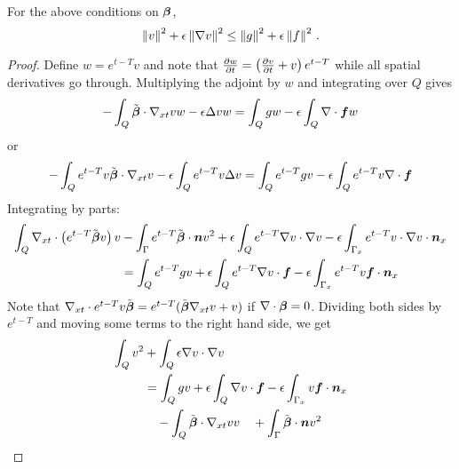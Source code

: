 \documentclass{article}
\begin{document}
\begin{lemma}
\label{lem:l2}
For the above conditions on $\boldsymbol\beta$,
\[
\left\| v \right\|^2+\epsilon\left\| \nabla v \right\|^2\leq\left\| g \right\|^2+\epsilon\left\| f \right\|^2\,.
\]
\end{lemma}
\begin{proof}
Define $w=e^{t-T}v$ and note that $\frac{\partial w}{\partial t}=\left( \frac{\partial v}{\partial t}+v \right)e^{t-T}$ while
all spatial derivatives go through.
Multiplying the adjoint by $w$ and integrating over $Q$ gives
\begin{align*}
-\int_Q\tilde{\boldsymbol\beta}\cdot\nabla_{xt} vw-\epsilon\Delta vw=\int_Qgw-\epsilon\int_Q\nabla\cdot\boldsymbol f w
\end{align*}
or
\begin{align*}
-\int_Qe^{t-T}v\tilde{\boldsymbol\beta}\cdot\nabla_{xt} v-\epsilon\int_Q e^{t-T}v\Delta v=\int_Qe^{t-T}gv-\epsilon\int_Qe^{t-T}v\nabla\cdot\boldsymbol f
\end{align*}
Integrating by parts:
\begin{align*}
\int_Q\nabla_{xt}\cdot\left( e^{t-T}\tilde{\boldsymbol\beta} v \right)v&
-\int_\Gamma e^{t-T}\tilde{\boldsymbol\beta}\cdot\boldsymbol n v^2
+\epsilon\int_Qe^{t-T}\nabla v\cdot\nabla v
-\epsilon\int_{\Gamma_x}e^{t-T}v\cdot\nabla v\cdot\boldsymbol n_x
\\
&=
\int_Qe^{t-T}gv
+\epsilon\int_Qe^{t-T}\nabla v\cdot\boldsymbol f
-\epsilon\int_{\Gamma_x}e^{t-T}v\boldsymbol f\cdot\boldsymbol n_x
\end{align*}
Note that $\nabla_{xt}\cdot{e^{t-T}v\tilde{\boldsymbol\beta}}=e^{t-T}(\tilde{\boldsymbol\beta}\nabla_{xt} v+v)$ if $\nabla\cdot\boldsymbol\beta=0$.
Dividing both sides by $e^{t-T}$ and moving some terms to the right hand side, we get
\begin{align*}
\int_Q v^2
&+\int_Q\epsilon \Grad v\cdot\Grad v
\\
&=
\int_Qgv
+\epsilon\int_Q\Grad v\cdot\bff
-\epsilon\int_{\Gamma_x}v\bff\cdot\bfn_x\\
&\quad-\int_Q\tilde\bfbeta\cdot\Gradxt vv
\quad+\int_\Gamma \tilde\bfbeta\cdot\bfn v^2

\end{align*}
\end{proof}
\end{document}
